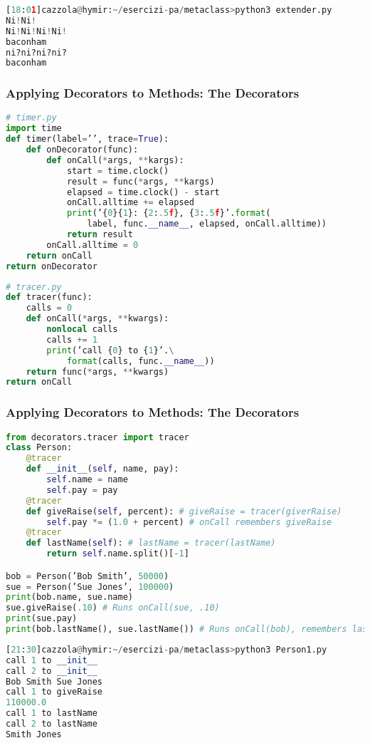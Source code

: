 \begin{lstlisting}[language=Python]
[18:01]cazzola@hymir:~/esercizi-pa/metaclass>python3 extender.py
Ni!Ni!
Ni!Ni!Ni!Ni!
baconham
ni?ni?ni?ni?
baconham
\end{lstlisting}

\subsubsection{Applying Decorators to Methods: The Decorators}

\begin{lstlisting}[language=Python]
# timer.py
import time
def timer(label=’’, trace=True):
	def onDecorator(func):
		def onCall(*args, **kargs):
			start = time.clock()
			result = func(*args, **kargs)
			elapsed = time.clock() - start
			onCall.alltime += elapsed
			print(’{0}{1}: {2:.5f}, {3:.5f}’.format(
				label, func.__name__, elapsed, onCall.alltime))
			return result
		onCall.alltime = 0
	return onCall
return onDecorator
\end{lstlisting}

\begin{lstlisting}[language=Python]
# tracer.py
def tracer(func):
	calls = 0
	def onCall(*args, **kwargs):
		nonlocal calls
		calls += 1
		print(’call {0} to {1}’.\
			format(calls, func.__name__))
	return func(*args, **kwargs)
return onCall
\end{lstlisting}

\subsubsection{Applying Decorators to Methods: The Decorators}

\begin{lstlisting}[language=Python]
from decorators.tracer import tracer
class Person:
	@tracer
	def __init__(self, name, pay):
		self.name = name
		self.pay = pay
	@tracer
	def giveRaise(self, percent): # giveRaise = tracer(giverRaise)
		self.pay *= (1.0 + percent) # onCall remembers giveRaise
	@tracer
	def lastName(self): # lastName = tracer(lastName)
		return self.name.split()[-1]

bob = Person(’Bob Smith’, 50000)
sue = Person(’Sue Jones’, 100000)
print(bob.name, sue.name)
sue.giveRaise(.10) # Runs onCall(sue, .10)
print(sue.pay)
print(bob.lastName(), sue.lastName()) # Runs onCall(bob), remembers lastName
\end{lstlisting}

\begin{lstlisting}[language=Python]
[21:30]cazzola@hymir:~/esercizi-pa/metaclass>python3 Person1.py
call 1 to __init__
call 2 to __init__
Bob Smith Sue Jones
call 1 to giveRaise
110000.0
call 1 to lastName
call 2 to lastName
Smith Jones
\end{lstlisting}

